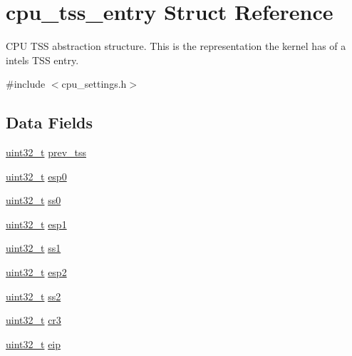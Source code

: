 \hypertarget{structcpu__tss__entry}{}\section{cpu\+\_\+tss\+\_\+entry Struct Reference}
\label{structcpu__tss__entry}


C\+PU T\+SS abstraction structure. This is the representation the kernel has of a intel\textquotesingle{}s T\+SS entry.  




{\ttfamily \#include $<$cpu\+\_\+settings.\+h$>$}

\subsection*{Data Fields}
\begin{DoxyCompactItemize}
\item 
\hyperlink{stdint_8h_a324c5d28c0d82f502a234ab99efac87a}{uint32\+\_\+t} \hyperlink{structcpu__tss__entry_a162f247adf800620ad2b69b1e9ea07f4}{prev\+\_\+tss}
\item 
\hyperlink{stdint_8h_a324c5d28c0d82f502a234ab99efac87a}{uint32\+\_\+t} \hyperlink{structcpu__tss__entry_ab8a56bd35e5f4765a5f6736fdd829a2f}{esp0}
\item 
\hyperlink{stdint_8h_a324c5d28c0d82f502a234ab99efac87a}{uint32\+\_\+t} \hyperlink{structcpu__tss__entry_a7874b70fa3a93da1588513500cbdf1a8}{ss0}
\item 
\hyperlink{stdint_8h_a324c5d28c0d82f502a234ab99efac87a}{uint32\+\_\+t} \hyperlink{structcpu__tss__entry_a92a8ac30e06c41b14fe2eb5f69f9ade6}{esp1}
\item 
\hyperlink{stdint_8h_a324c5d28c0d82f502a234ab99efac87a}{uint32\+\_\+t} \hyperlink{structcpu__tss__entry_a954b751e620c509ef5538e6cd434ea4e}{ss1}
\item 
\hyperlink{stdint_8h_a324c5d28c0d82f502a234ab99efac87a}{uint32\+\_\+t} \hyperlink{structcpu__tss__entry_a17c64abe1958f7f481d0fbef826ad21f}{esp2}
\item 
\hyperlink{stdint_8h_a324c5d28c0d82f502a234ab99efac87a}{uint32\+\_\+t} \hyperlink{structcpu__tss__entry_ac96ed21da44a3e051bf3cd7d4f186c1e}{ss2}
\item 
\hyperlink{stdint_8h_a324c5d28c0d82f502a234ab99efac87a}{uint32\+\_\+t} \hyperlink{structcpu__tss__entry_aa9166a91c5e8b2b51b0a9677f9ba56a0}{cr3}
\item 
\hyperlink{stdint_8h_a324c5d28c0d82f502a234ab99efac87a}{uint32\+\_\+t} \hyperlink{structcpu__tss__entry_a1588906901fc3015e0865574669a56a6}{eip}

\end{DoxyCompactItemize}

